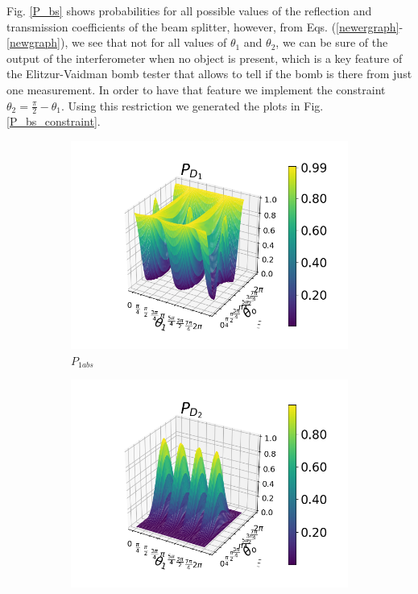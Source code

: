 \documentclass[12pt]{book}
\begin{document}
Fig. \ref{P_bs} shows probabilities for all possible values of the reflection and transmission coefficients of the beam splitter, however, from Eqs. (\ref{newergraph}-\ref{newgraph}), we see that not for all values of $\theta_{1}$ and $\theta_{2}$, we can be sure of the output of the interferometer when no object is present, which is a key feature of the Elitzur-Vaidman bomb tester that allows to tell if the bomb is there from just one measurement. In order to have that feature we implement the constraint $\theta_{2}=\frac{\pi}{2}-\theta_{1}$. Using this restriction we generated the plots in Fig. \ref{P_bs_constraint}.
\begin{figure}[t!]
\centering
\begin{subfigure}[b]{0.45\linewidth}
\includegraphics[width=\linewidth]{images/PD1_BS_h.png}
\caption{$P_{1abs}$}
\label{fig:BS1}
\end{subfigure}
\begin{subfigure}[b]{0.45\linewidth}
\includegraphics[width=\linewidth]{images/PD2_BS_h.png}

\end{subfigure}
\end{figure}
\end{document}
